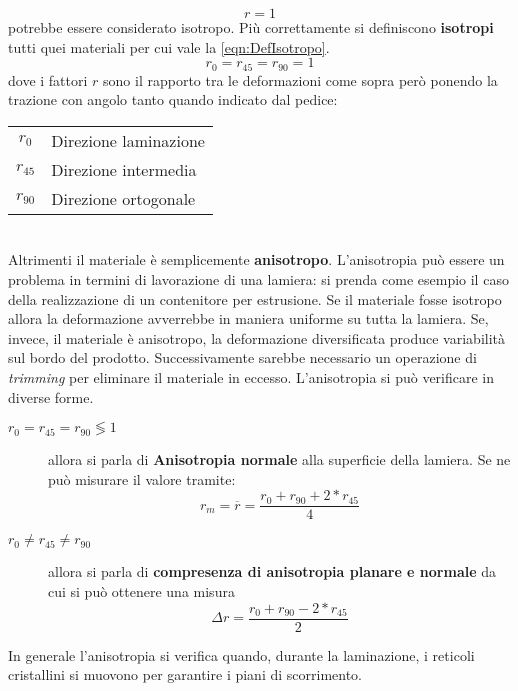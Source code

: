 \begin{equation}
r = 1
\end{equation}
potrebbe essere considerato isotropo. Più correttamente si definiscono \textbf{isotropi} tutti quei materiali per cui vale la \ref{eqn:DefIsotropo}.
\begin{equation}
r_0 = r_{45} = r_{90} = 1
\label{eqn:DefIsotropo}
\end{equation}
dove i fattori $r$ sono il rapporto tra le deformazioni come sopra però ponendo la trazione con angolo tanto quando indicato dal pedice:\\
\begin{tabular}{cl}
$r_0$ & Direzione laminazione\\
$r_{45}$ & Direzione intermedia\\
$r_{90}$ & Direzione ortogonale
\end{tabular}
\\
Altrimenti il materiale è semplicemente \textbf{anisotropo}.
L'anisotropia può essere un problema in termini di lavorazione di una lamiera: si prenda come esempio il caso della realizzazione di un contenitore per estrusione. Se il materiale fosse isotropo allora la deformazione avverrebbe in maniera uniforme su tutta la lamiera.
Se, invece, il materiale è anisotropo, la deformazione diversificata produce variabilità sul bordo del prodotto. Successivamente sarebbe necessario un operazione di \textit{trimming} per eliminare il materiale in eccesso.
L'anisotropia si può verificare in diverse forme.
\begin{description}
\item[$r_0 = r_{45} = r_{90} \lessgtr 1$] allora si parla di \textbf{Anisotropia normale} alla superficie della lamiera. Se ne può misurare il valore tramite:
\begin{equation}
r_m = \overline{r} = \frac{r_0 + r_{90} + 2 * r_{45}}{4}
\label{eqn:MisAnisotropia}
\end{equation}
\item[$r_0 \neq r_{45} \neq r_{90}$] allora si parla di \textbf{compresenza di anisotropia planare e normale} da cui si può ottenere una misura
\begin{equation}
\Delta r = \frac{r_0 + r_{90} - 2 * r_{45}}{2}
\label{eqn:MisPlanare}
\end{equation}
\end{description}
In generale l'anisotropia si verifica quando, durante la laminazione, i reticoli cristallini si muovono per garantire i piani di scorrimento.
